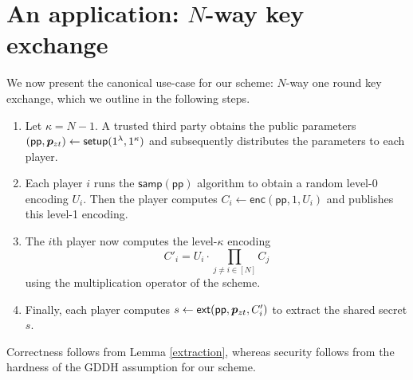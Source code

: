 \section{An application: $N$-way key exchange}

We now present the canonical use-case for our scheme: $N$-way one round key exchange, which we outline in the following steps.

\begin{enumerate}
\item  Let $\kappa = N - 1$. A trusted third party obtains the public parameters $(\mathsf{pp}, \bm{p}_{zt}) \leftarrow \mathsf{setup}(1^\lambda, 1^\kappa)$  and subsequently distributes the parameters to each player.

\item Each player $i$ runs the $\mathsf{samp}(\mathsf{pp})$ algorithm to obtain a random level-0 encoding $U_i$.  Then the player computes $C_i \leftarrow \mathsf{enc}(\mathsf{pp}, 1, U_i)$ and publishes this level-1 encoding.

\item The $i$th player now computes the level-$\kappa$ encoding $$C'_i = U_i \cdot \prod_{j\not= i \in [N]} C_j$$ using the multiplication operator of the scheme.

\item  Finally, each player computes $s \leftarrow \mathsf{ext}(\mathsf{pp}, \bm{p}_{zt}, C'_i)$ to extract the shared secret $s$.
\end{enumerate}

Correctness follows from Lemma \ref{extraction}, whereas security follows from the hardness of the GDDH assumption for our scheme.
